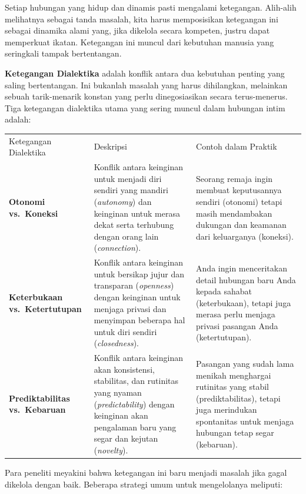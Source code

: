 \documentclass[
  letterpaper,
  DIV=11,
  numbers=noendperiod]{scrreprt}
\begin{document}
Setiap hubungan yang hidup dan dinamis pasti mengalami ketegangan.
Alih-alih melihatnya sebagai tanda masalah, kita harus memposisikan
ketegangan ini sebagai dinamika alami yang, jika dikelola secara
kompeten, justru dapat memperkuat ikatan. Ketegangan ini muncul dari
kebutuhan manusia yang seringkali tampak bertentangan.

\textbf{Ketegangan Dialektika} adalah konflik antara dua kebutuhan
penting yang saling bertentangan. Ini bukanlah masalah yang harus
dihilangkan, melainkan sebuah tarik-menarik konstan yang perlu
dinegosiasikan secara terus-menerus. Tiga ketegangan dialektika utama
yang sering muncul dalam hubungan intim adalah:

\begin{longtable}[]{@{}
  >{\raggedright\arraybackslash}p{}
  >{\raggedright\arraybackslash}p{}
  >{\raggedright\arraybackslash}p{}@{}}
\toprule\noalign{}
\endhead
\bottomrule\noalign{}
\endlastfoot
Ketegangan Dialektika & Deskripsi & Contoh dalam Praktik \\
\textbf{Otonomi vs.~Koneksi} & Konflik antara keinginan untuk menjadi
diri sendiri yang mandiri (\emph{autonomy}) dan keinginan untuk merasa
dekat serta terhubung dengan orang lain (\emph{connection}). & Seorang
remaja ingin membuat keputusannya sendiri (otonomi) tetapi masih
mendambakan dukungan dan keamanan dari keluarganya (koneksi). \\
\textbf{Keterbukaan vs.~Ketertutupan} & Konflik antara keinginan untuk
bersikap jujur dan transparan (\emph{openness}) dengan keinginan untuk
menjaga privasi dan menyimpan beberapa hal untuk diri sendiri
(\emph{closedness}). & Anda ingin menceritakan detail hubungan baru Anda
kepada sahabat (keterbukaan), tetapi juga merasa perlu menjaga privasi
pasangan Anda (ketertutupan). \\
\textbf{Prediktabilitas vs.~Kebaruan} & Konflik antara keinginan akan
konsistensi, stabilitas, dan rutinitas yang nyaman
(\emph{predictability}) dengan keinginan akan pengalaman baru yang segar
dan kejutan (\emph{novelty}). & Pasangan yang sudah lama menikah
menghargai rutinitas yang stabil (prediktabilitas), tetapi juga
merindukan spontanitas untuk menjaga hubungan tetap segar (kebaruan). \\
\end{longtable}

Para peneliti meyakini bahwa ketegangan ini baru menjadi masalah jika
gagal dikelola dengan baik. Beberapa strategi umum untuk mengelolanya
meliputi:
\end{document}
